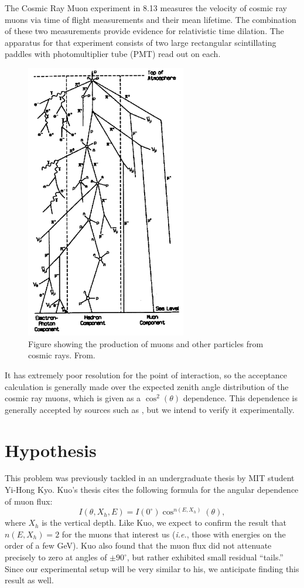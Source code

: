 The Cosmic Ray Muon experiment in 8.13 measures the velocity of cosmic ray muons via time of flight measurements and their mean lifetime. The combination of these two measurements provide evidence for relativistic time dilation. The apparatus for that experiment consists of two large rectangular scintillating paddles with photomultiplier tube (PMT) read out on each. 

\begin{figure}[htb]
\includegraphics[width=7cm]{muon_shower.png}
\caption{Figure showing the production of muons and other particles from cosmic rays. From\cite{grieder}.}
\label{fig:muon_shower}
\end{figure}

It has extremely poor resolution for the point of interaction, so the acceptance calculation is generally made over the expected zenith angle distribution of the cosmic ray muons, which is given as a $\cos^2(\theta)$ dependence. This dependence is generally accepted by sources such as \cite{pdg}, but we intend to verify it experimentally.

\section{Hypothesis}

This problem was previously tackled in an undergraduate thesis by MIT student Yi-Hong Kyo.\cite{kuo} Kuo's  thesis cites the following formula for the angular dependence of muon flux:
\begin{equation}
\label{eqn:cosn}
I(\theta,X_h,E)=I(0^\circ)\cos^{n(E,X_h)}(\theta),
\end{equation}
where $X_h$ is the vertical depth. Like Kuo, we expect to confirm the result that $n(E,X_h)=2$ for the muons that interest us (\emph{i.e.}, those with energies on the order of a few GeV). Kuo also found that the muon flux did not attenuate precisely to zero at angles of $\pm90^\circ$, but rather exhibited small residual ``tails.'' Since our experimental setup will be very similar to his, we anticipate finding this result as well.

